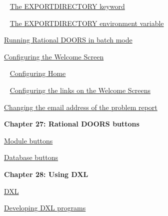 \documentclass[11pt,a4paper]{article}
\begin{document}
\,\,\, \href{https://www.ibm.com/support/knowledgecenter/search/The%20EXPORTDIRECTORY%20keyword?scope=SSYQBZ_9.6.1}{The EXPORTDIRECTORY keyword}

\,\,\, \href{https://www.ibm.com/support/knowledgecenter/search/The%20EXPORTDIRECTORY%20environment%20variable?scope=SSYQBZ_9.6.1}{The EXPORTDIRECTORY environment variable}

\href{https://www.ibm.com/support/knowledgecenter/search/Running%20Rational%20DOORS%20in%20batch%20mode?scope=SSYQBZ_9.6.1}{Running Rational DOORS in batch mode}

\href{https://www.ibm.com/support/knowledgecenter/search/Configuring%20the%20Welcome%20Screen?scope=SSYQBZ_9.6.1}{Configuring the Welcome Screen}

\,\,\, \href{https://www.ibm.com/support/knowledgecenter/search/Configuring%20Home?scope=SSYQBZ_9.6.1}{Configuring Home}

\,\,\, \href{https://www.ibm.com/support/knowledgecenter/search/Configuring%20the%20links%20on%20the%20Welcome%20Screens?scope=SSYQBZ_9.6.1}{Configuring the links on the Welcome Screens}

\href{https://www.ibm.com/support/knowledgecenter/search/Changing%20the%20email%20address%20of%20the%20problem%20report?scope=SSYQBZ_9.6.1}{Changing the email address of the problem report} \\



\begin{Large}\textbf{Chapter 27: Rational DOORS buttons} \end{Large} 
\vspace{1mm}

\href{https://www.ibm.com/support/knowledgecenter/search/Module%20buttons?scope=SSYQBZ_9.6.1}{Module buttons}

\href{https://www.ibm.com/support/knowledgecenter/search/Database%20buttons?scope=SSYQBZ_9.6.1}{Database buttons} \\



\begin{Large}\textbf{Chapter 28: Using DXL} \end{Large} 
\vspace{1mm}

\href{https://www.ibm.com/support/knowledgecenter/search/DXL?scope=SSYQBZ_9.6.1}{DXL}

\href{https://www.ibm.com/support/knowledgecenter/search/Developing%20DXL%20programs?scope=SSYQBZ_9.6.1}{Developing DXL programs}
\end{document}
